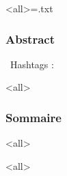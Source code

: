 \documentclass[ignorenonframetext,9pt,allowframebreaks,aspectratio=169]{beamer}
\title{\utitle}
\subtitle{\ushorttitle}
\author{\uauthor}
\institute[\uinstituteshort]{{\uinstitute \\ \uchaire}}
\institute{\uinstituteshort}
\begin{document}
\mode<all>{\immediate\openout\audioexport=\jobname.txt}

\begin{frame}[plain]
\titlepage
\end{frame}


\begin{frame}
	\frametitle{Abstract}
	\begin{techworkin} [righthand width=.6\textwidth]{\faCogs~\small {Hashtags} : \ukeywords}\large\uabstract
	\end{techworkin}
	\end{frame}



\mode<all>{}



\begin{frame}
  \frametitle{Sommaire}
  \begin{multicols}{2}
  \tableofcontents
  \end{multicols}
  \end{frame}

\mode<all>{\ubody}

\mode<all>{}
\end{document}

